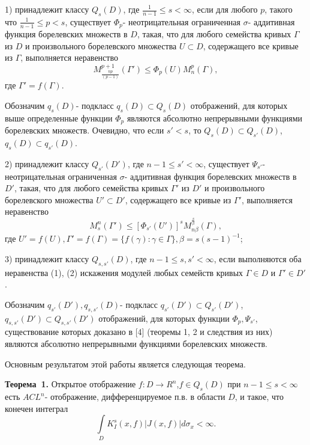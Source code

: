    1) принадлежит классу $Q_{s}(D)$, где $\frac{1}{n-1}\leq s<\infty$, если для любого $p$, такого что $\frac{1}{n-1}\leq p<s$, существует $\Phi_{p}$- неотрицательная ограниченная $\sigma$- аддитивная функция борелевских множеств в $D$, такая, что для любого семейства кривых $\Gamma$ из $D$ и произвольного борелевского множества $U\subset D$, содержащего все кривые из $\Gamma$, выполняется неравенство
 \begin{equation}\label{eq-1}
 	M_{\frac{np}{(p-1)}}^{p+1}(\Gamma')\leq\Phi_{p}(U)M^{p}_{n}(\Gamma),
 \end{equation}
где $\Gamma'=f(\Gamma)$.

Обозначим $q_{s}(D)$- подкласс $q_{s}(D)\subset Q_{s}(D)$ отображений, для которых выше определенные функции $\Phi_{p}$ являются абсолютно непрерывными функциями борелевских множеств. Очевидно, что если $s'<s$, то $Q_{s}(D)\subset Q_{s'}(D)$, $q_{s}(D)\subset q_{s'}(D)$.

2) принадлежит классу $Q_{s'}(D')$, где $n-1\leq s'<\infty$, существует $\Psi_{s'}$- неотрицательная ограниченная $\sigma$- аддитивная функция борелевских множеств в $D'$, такая, что для любого семейства кривых $\Gamma'$ из $D'$ и произвольного борелевского множества $U'\subset D'$, содержащего все кривые из $\Gamma'$, выполняется неравенство
\begin{equation}\label{eq-2}
M_{s}^{n}(\Gamma')\leq[\Phi_{s'}(U')]^{s}M^{\frac{s}{\beta}}_{n\beta}(\Gamma),
\end{equation}
где $U'=f(U),\Gamma'=f(\Gamma)=\{f(\gamma):\gamma\in\Gamma\},\beta=s(s-1)^{-1}$;

3) принадлежит классу $Q_{s,s'}(D)$, где $n-1\leq s,s'<\infty$, если выполняются оба неравенства (1), (2) искажения модулей любых семейств кривых $\Gamma\in D$ и $\Gamma'\in D'$.

Обозначим $q_{s'}(D'),q_{s,s'}(D)$- подкласс $q_{s'}(D')\subset Q_{s'}(D')$, $q_{s,s'}(D')\subset Q_{s,s'}(D')$ отображений, для которых функции $\Phi_{p},\Psi_{s'}$, существование которых доказано в [4] (теоремы 1, 2 и следствия из них) являются абсолютно непрерывными функциями борелевских множеств.

Основным результатом этой работы является следующая теорема.


\textbf{Теорема~1.} Открытое отображение $f:D\rightarrow R^{n}$,$f\in Q_{s}(D)$ при $n-1\leq s<\infty$ есть $ACL^{n}$- отображение, дифференцируемое п.в. в области $D$, и такое, что конечен интеграл
\begin{equation*}
\int\limits_{D}K^{s}_{I}(x,f)|J(x,f)|d\sigma_{x}<\infty.
\end{equation*}


